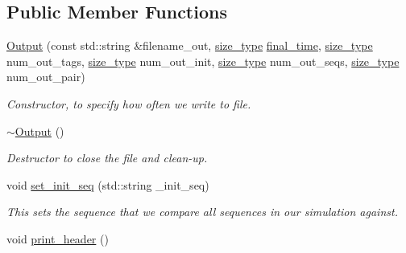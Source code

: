\subsection*{Public Member Functions}
\begin{DoxyCompactItemize}
\item 
\hyperlink{classretrocombinator_1_1Output_ac4dcc9e837413d0669f5b943f8d82dde}{Output} (const std\+::string \&filename\+\_\+out, \hyperlink{constants_8h_a8e1541b50cee66a791df4c437ccbb385}{size\+\_\+type} \hyperlink{classretrocombinator_1_1Output_a94f5e60b0aafcc409c78507c5e34ba7a}{final\+\_\+time}, \hyperlink{constants_8h_a8e1541b50cee66a791df4c437ccbb385}{size\+\_\+type} num\+\_\+out\+\_\+tags, \hyperlink{constants_8h_a8e1541b50cee66a791df4c437ccbb385}{size\+\_\+type} num\+\_\+out\+\_\+init, \hyperlink{constants_8h_a8e1541b50cee66a791df4c437ccbb385}{size\+\_\+type} num\+\_\+out\+\_\+seqs, \hyperlink{constants_8h_a8e1541b50cee66a791df4c437ccbb385}{size\+\_\+type} num\+\_\+out\+\_\+pair)
\begin{DoxyCompactList}\small\item\em Constructor, to specify how often we write to file. \end{DoxyCompactList}\item 
\mbox{\label{classretrocombinator_1_1Output_a61d0840daf98bea49e4dc471f235eeab}} 
\hyperlink{classretrocombinator_1_1Output_a61d0840daf98bea49e4dc471f235eeab}{$\sim$\+Output} ()
\begin{DoxyCompactList}\small\item\em Destructor to close the file and clean-\/up. \end{DoxyCompactList}\item 
\mbox{\label{classretrocombinator_1_1Output_a5feb518230443e8259aeb3b12ecae437}} 
void \hyperlink{classretrocombinator_1_1Output_a5feb518230443e8259aeb3b12ecae437}{set\+\_\+init\+\_\+seq} (std\+::string \+\_\+init\+\_\+seq)
\begin{DoxyCompactList}\small\item\em This sets the sequence that we compare all sequences in our simulation against. \end{DoxyCompactList}\item 
\mbox{\label{classretrocombinator_1_1Output_a210fa5a86077912c8cf95d15603c1ad2}} 
void \hyperlink{classretrocombinator_1_1Output_a210fa5a86077912c8cf95d15603c1ad2}{print\+\_\+header} ()

\end{DoxyCompactItemize}
